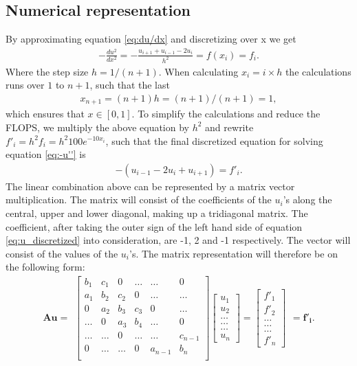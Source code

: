 \documentclass{emulateapj}
\begin{document}
\subsection{Numerical representation}
By approximating equation \eqref{eq:du/dx} and discretizing over x we get
%
\begin{gather*}
    -\frac{du^2}{dx^2} = -\frac{u_{i+1} + u_{i-1} - 2u_i}{h^2} = f(x_i) = f_i.
\end{gather*}
%
Where the step size $h = 1/(n+1)$. When calculating $x_i = i\times h$ the calculations runs over $1$ to $n+1$, such that the last
%
\begin{gather}
    x_{n+1} = (n+1)h = (n+1)/(n+1) = 1,
\end{gather}
%
which ensures that $x \in [0,1]$. To simplify the calculations and reduce the FLOPS, we multiply the above equation by $h^2$ and rewrite $f'_i = h^2f_i = h^2 100 e^{-10x_i}$, such that the final discretized equation for solving equation \eqref{eq:-u''} is
%
\begin{gather}\label{eq:u_discretized}
    -\left(u_{i-1} - 2u_i + u_{i+1}\right) = f'_i.
\end{gather}
%
The linear combination above can be represented by a matrix vector multiplication. The matrix will consist of the coefficients of the $u_i$'s along the central, upper and lower diagonal, making up a tridiagonal matrix. The coefficient, after taking the outer sign of the left hand side of equation \eqref{eq:u_discretized} into consideration, are -1, 2 and -1 respectively. The vector will consist of the values of the $u_i$'s. The matrix representation will therefore be on the following form:
%
\[ \boldsymbol{Au} =
\begin{array}{c}
\begin{bmatrix}\label{eq:Au=f}
b_1     & c_1           & 0         & \dots     & \dots     & 0 \\
a_1     & b_2           & c_2       & 0         & \dots     & \dots \\
0       & a_2           & b_3       & c_3       & 0     & \dots\\
\dots  &  0            & a_3       & b_4       & \dots    & 0 \\
\dots  & \dots        & 0 & \dots    & \dots    & c_{n-1} \\
0       & \dots         & \dots         & 0         & a_{n-1}   & b_n   \\
\end{bmatrix}
\begin{bmatrix}
u_1 \\
u_2 \\
\dots \\
\dots \\
\dots \\
u_n
\end{bmatrix}
=
\begin{bmatrix}
f'_1 \\
f'_2 \\
\dots \\
\dots \\
\dots \\
f'_n
\end{bmatrix}
\end{array}
= \boldsymbol{f'_i}.
\]
\end{document}
